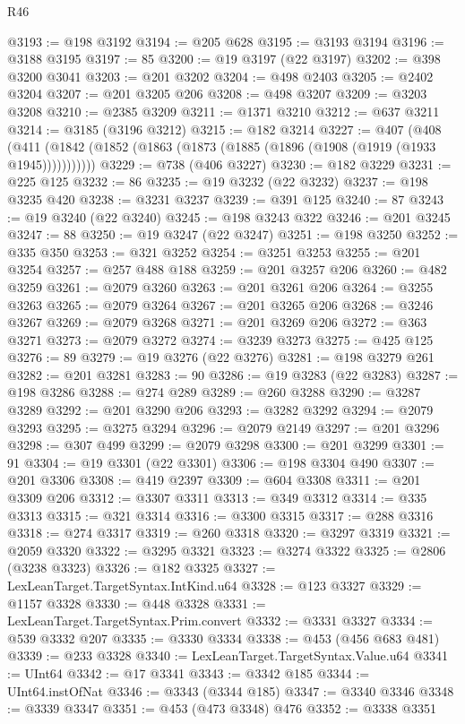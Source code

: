 \begin{lexlean}{R46}
\begin{coremodule}
@3193 := @198 @3192
@3194 := @205 @628
@3195 := @3193 @3194
@3196 := @3188 @3195
@3197 := 85
@3200 := @19 @3197 (@22 @3197)
@3202 := @398 @3200 @3041
@3203 := @201 @3202
@3204 := @498 @2403
@3205 := @2402 @3204
@3207 := @201 @3205 @206
@3208 := @498 @3207
@3209 := @3203 @3208
@3210 := @2385 @3209
@3211 := @1371 @3210
@3212 := @637 @3211
@3214 := @3185 (@3196 @3212)
@3215 := @182 @3214
@3227 := @407
    (@408 (@411 (@1842 (@1852 (@1863 (@1873 (@1885 (@1896 (@1908 (@1919 (@1933 @1945)))))))))))
@3229 := @738 (@406 @3227)
@3230 := @182 @3229
@3231 := @225 @125
@3232 := 86
@3235 := @19 @3232 (@22 @3232)
@3237 := @198 @3235 @420
@3238 := @3231 @3237
@3239 := @391 @125
@3240 := 87
@3243 := @19 @3240 (@22 @3240)
@3245 := @198 @3243 @322
@3246 := @201 @3245
@3247 := 88
@3250 := @19 @3247 (@22 @3247)
@3251 := @198 @3250
@3252 := @335 @350
@3253 := @321 @3252
@3254 := @3251 @3253
@3255 := @201 @3254
@3257 := @257 @488 @188
@3259 := @201 @3257 @206
@3260 := @482 @3259
@3261 := @2079 @3260
@3263 := @201 @3261 @206
@3264 := @3255 @3263
@3265 := @2079 @3264
@3267 := @201 @3265 @206
@3268 := @3246 @3267
@3269 := @2079 @3268
@3271 := @201 @3269 @206
@3272 := @363 @3271
@3273 := @2079 @3272
@3274 := @3239 @3273
@3275 := @425 @125
@3276 := 89
@3279 := @19 @3276 (@22 @3276)
@3281 := @198 @3279 @261
@3282 := @201 @3281
@3283 := 90
@3286 := @19 @3283 (@22 @3283)
@3287 := @198 @3286
@3288 := @274 @289
@3289 := @260 @3288
@3290 := @3287 @3289
@3292 := @201 @3290 @206
@3293 := @3282 @3292
@3294 := @2079 @3293
@3295 := @3275 @3294
@3296 := @2079 @2149
@3297 := @201 @3296
@3298 := @307 @499
@3299 := @2079 @3298
@3300 := @201 @3299
@3301 := 91
@3304 := @19 @3301 (@22 @3301)
@3306 := @198 @3304 @490
@3307 := @201 @3306
@3308 := @419 @2397
@3309 := @604 @3308
@3311 := @201 @3309 @206
@3312 := @3307 @3311
@3313 := @349 @3312
@3314 := @335 @3313
@3315 := @321 @3314
@3316 := @3300 @3315
@3317 := @288 @3316
@3318 := @274 @3317
@3319 := @260 @3318
@3320 := @3297 @3319
@3321 := @2059 @3320
@3322 := @3295 @3321
@3323 := @3274 @3322
@3325 := @2806 (@3238 @3323)
@3326 := @182 @3325
@3327 := LexLeanTarget.TargetSyntax.IntKind.u64
@3328 := @123 @3327
@3329 := @1157 @3328
@3330 := @448 @3328
@3331 := LexLeanTarget.TargetSyntax.Prim.convert
@3332 := @3331 @3327
@3334 := @539 @3332 @207
@3335 := @3330 @3334
@3338 := @453 (@456 @683 @481)
@3339 := @233 @3328
@3340 := LexLeanTarget.TargetSyntax.Value.u64
@3341 := UInt64
@3342 := @17 @3341
@3343 := @3342 @185
@3344 := UInt64.instOfNat
@3346 := @3343 (@3344 @185)
@3347 := @3340 @3346
@3348 := @3339 @3347
@3351 := @453 (@473 @3348) @476
@3352 := @3338 @3351

\end{coremodule}
\end{lexlean}
